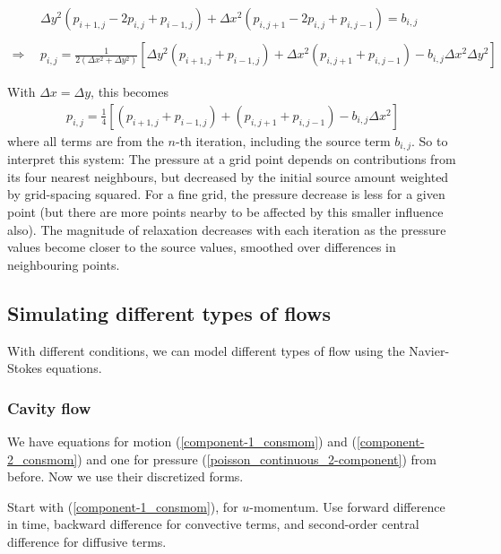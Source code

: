 \documentclass[11pt]{article}
\begin{document}
{\begin{align}
&\Delta y^2 (p_{i+1,j} - 2p_{i,j} + p_{i-1,j}) + \Delta x^2 (p_{i,j+1} - 2p_{i,j} + p_{i,j-1})
 = b_{i,j}
	\nonumber \\ \nonumber \\
\Rightarrow ~~&
p_{i,j} = \frac{1}{2(\Delta x^2 + \Delta y^2)}
		 \left[ \Delta y^2(p_{i+1,j} + p_{i-1,j}) + \Delta x^2(p_{i,j+1} + p_{i,j-1})
		 - b_{i,j} \Delta x^2 \Delta y^2 \right]
\end{align}

With $\Delta x = \Delta y$, this becomes
\begin{align}
p_{i,j} = \frac{1}{4}
		 \left[ (p_{i+1,j} + p_{i-1,j}) + (p_{i,j+1} + p_{i,j-1})
		 - b_{i,j} \Delta x^2 \right]
\label{transpoisson}
\end{align}
where all terms are from the $n$-th iteration, including the source term $b_{i,j}$.
So to interpret this system:
The pressure at a grid point depends on contributions from its four nearest
neighbours, but decreased by the initial source amount weighted by grid-spacing squared.
For a fine grid, the pressure decrease is less for a given point (but there are more points
nearby to be affected by this smaller influence also).
The magnitude of relaxation decreases with each iteration as the pressure values become closer
to the source values, smoothed over differences in neighbouring points.


\subsection{Simulating different types of flows}
With different conditions, we can model different types of flow using the Navier-Stokes equations.

\subsubsection{Cavity flow}
We have equations for motion (\ref{component-1_consmom}) and (\ref{component-2_consmom})
and one for pressure (\ref{poisson_continuous_2-component}) from before. Now we use their
discretized forms.

Start with (\ref{component-1_consmom}), for $u$-momentum. Use forward difference in time,
backward difference for convective terms, and second-order central difference for diffusive terms.

}
\end{document}
